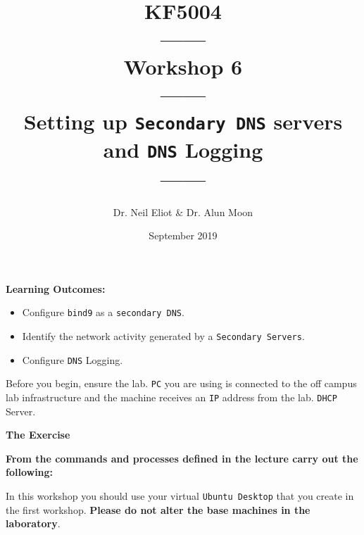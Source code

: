 \documentclass[11pt]{article}
\begin{document}
\author{Dr. Neil Eliot \& Dr. Alun Moon}
\title{KF5004\\------\\Workshop 6\\------\\Setting up \texttt{Secondary DNS} servers and \texttt{DNS} Logging\\------}
\date{September 2019}
\maketitle

\newpage



\noindent\textbf{Learning Outcomes:}
\begin{itemize}
    \item Configure \texttt{bind9} as a \texttt{secondary DNS}.
    \item Identify the network activity generated by a \texttt{Secondary Servers}.
    \item Configure \texttt{DNS} Logging.
\end{itemize}


\begin{tcolorbox}[title={\textbf{Important:}}]
    Before you begin, ensure the lab. \texttt{PC} you are using is connected to the off campus lab infrastructure and the machine receives an \texttt{IP} address from the lab. \texttt{DHCP} Server.
\end{tcolorbox}
\newpage

\noindent\textbf{The Exercise}\\
\begin{tcolorbox}[colback=blue!20]
    \noindent\textbf{From the commands and processes defined in the lecture carry out the following:}
\end{tcolorbox}


\begin{tcolorbox}[title={\textbf{NOTE:}}]
    In this workshop you should use your virtual \texttt{Ubuntu Desktop} that you create in the first workshop. \textbf{Please do not alter the base machines in the laboratory}.
\end{tcolorbox}
\end{document}

